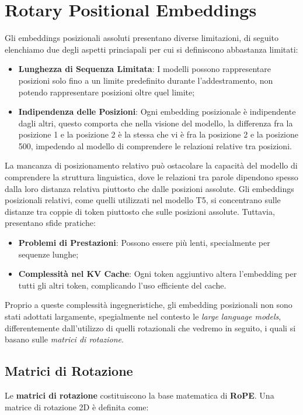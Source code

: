 \section{Rotary Positional Embeddings}
Gli embeddings posizionali assoluti presentano diverse limitazioni, di seguito elenchiamo due degli aspetti princiapali per cui si definiscono abbastanza limitati:

\begin{itemize}
    \item \textbf{Lunghezza di Sequenza Limitata}: I modelli possono rappresentare posizioni solo fino a un limite predefinito durante l'addestramento, non potendo rappresentare posizioni oltre quel limite;
    \item \textbf{Indipendenza delle Posizioni}: Ogni embedding posizionale è indipendente dagli altri, questo comporta che nella visione del modello, la differenza fra la posizione 1 e la posizione 2 è la stessa che vi è fra la posizione 2 e la posizione 500, impedendo al modello di comprendere le relazioni relative tra posizioni.
\end{itemize}

La mancanza di posizionamento relativo può ostacolare la capacità del modello di comprendere la struttura linguistica, dove le relazioni tra parole dipendono spesso dalla loro distanza relativa piuttosto che dalle posizioni assolute. Gli embeddings posizionali relativi, come quelli utilizzati nel modello T5, si concentrano sulle distanze tra coppie di token piuttosto che sulle posizioni assolute. Tuttavia, presentano sfide pratiche:

\begin{itemize}
    \item \textbf{Problemi di Prestazioni}: Possono essere più lenti, specialmente per sequenze lunghe;
    \item \textbf{Complessità nel KV Cache}: Ogni token aggiuntivo altera l'embedding per tutti gli altri token, complicando l'uso efficiente del cache.
\end{itemize}

Proprio a queste complessità ingegneristiche, gli embedding posizionali non sono stati adottati largamente, spegialmente nel contesto le \textit{large language models}, differentemente dall'utilizzo di quelli rotazionali che vedremo in seguito, i quali si basano sulle \textit{matrici di rotazione}.

\subsection{Matrici di Rotazione}
Le \textbf{matrici di rotazione} costituiscono la base matematica di \textbf{RoPE}. Una matrice di rotazione 2D è definita come:

